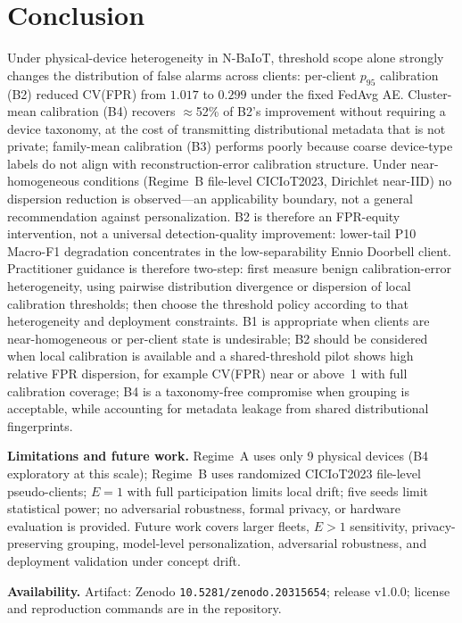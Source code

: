 \section{Conclusion}
\label{sec:conclusion}

Under physical-device heterogeneity in N-BaIoT, threshold scope alone strongly changes
the distribution of false alarms across clients: per-client $p_{95}$ calibration (B2)
reduced CV(FPR) from $1.017$ to $0.299$ under the fixed FedAvg AE.
Cluster-mean calibration (B4) recovers $\approx$52\% of B2's improvement without
requiring a device taxonomy, at the cost of transmitting distributional metadata that
is not private; family-mean calibration (B3) performs poorly because coarse device-type
labels do not align with reconstruction-error calibration structure.
Under near-homogeneous conditions (Regime~B file-level CICIoT2023, Dirichlet near-IID)
no dispersion reduction is observed---an applicability boundary, not a general
recommendation against personalization.
B2 is therefore an FPR-equity intervention, not a universal detection-quality improvement:
lower-tail P10 Macro-F1 degradation concentrates in the low-separability Ennio Doorbell
client. Practitioner guidance is therefore two-step: first measure benign calibration-error heterogeneity, using pairwise distribution divergence or dispersion of local calibration thresholds; then choose the threshold policy according to that heterogeneity and deployment constraints. B1 is appropriate when clients are near-homogeneous or per-client state is undesirable; B2 should be considered when local calibration is available and a shared-threshold pilot shows high relative FPR dispersion, for example CV(FPR) near or above~1 with full calibration coverage; B4 is a taxonomy-free compromise when grouping is acceptable, while accounting for metadata leakage from shared distributional fingerprints.

\textbf{Limitations and future work.}
Regime~A uses only 9 physical devices (B4 exploratory at this scale);
Regime~B uses randomized CICIoT2023 file-level pseudo-clients;
$E{=}1$ with full participation limits local drift; five seeds limit statistical power;
no adversarial robustness, formal privacy, or hardware evaluation is provided.
Future work covers larger fleets, $E>1$ sensitivity, privacy-preserving grouping,
model-level personalization, adversarial robustness, and deployment validation under
concept drift.

\textbf{Availability.} Artifact: Zenodo \nolinkurl{10.5281/zenodo.20315654}; release v1.0.0; license and reproduction commands are in the repository.
